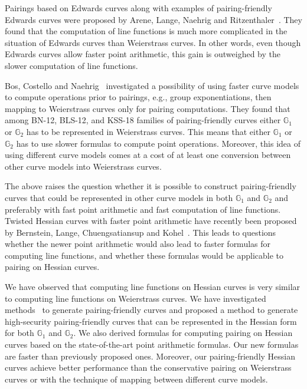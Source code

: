 Pairings based on Edwards curves
along with examples of pairing-friendly Edwards curves
were proposed by Arene, Lange, Naehrig and Ritzenthaler~\cite{2009/fastertate}.
They found that the computation of line functions is much more complicated in the situation of Edwards curves than Weierstrass curves.
In other words,
even though Edwards curves allow faster point arithmetic,
this gain is outweighed by the slower computation of line functions.

Bos, Costello and Naehrig~\cite{2013/bos-pairing} investigated a possibility of
using faster curve models to compute operations prior to pairings, e.g., group exponentiations,
then mapping to Weierstrass curves only for pairing computations.
They found that among BN-12, BLS-12, and KSS-18 families of pairing-friendly curves
either $\mathbb{G}_1$ or $\mathbb{G}_2$ has to be represented in Weierstrass curves.
This means that either $\mathbb{G}_1$ or $\mathbb{G}_2$ has to use slower formulas to compute point operations.
Moreover, this idea of using different curve models comes at a cost of at least one conversion
between other curve models into Weierstrass curves.

The above raises the question whether it is possible to construct pairing-friendly curves that could be
represented in other curve models in both $\mathbb{G}_1$ and $\mathbb{G}_2$
and preferably with fast point arithmetic and fast computation of line functions.
Twisted Hessian curves with faster point arithmetic have recently been proposed by
Bernstein, Lange, Chuengsatiansup and Kohel~\cite{2015/hessian}.
This leads to questions whether the newer point arithmetic would also lead to faster formulas for computing line functions,
and whether these formulas would be applicable to pairing on Hessian curves.

We have observed that computing line functions on Hessian curves is very similar to computing line functions on Weierstrass curves.
We have investigated methods~\cite{2010/freeman} to generate pairing-friendly curves
and proposed a method to generate high-security pairing-friendly curves
that can be represented in the Hessian form for both $\mathbb{G}_1$ and $\mathbb{G}_2$.
We also derived formulas for computing pairing on Hessian curves based on the state-of-the-art point arithmetic formulas.
Our new formulas are faster than previously proposed ones.
Moreover, our pairing-friendly Hessian curves achieve better performance than the conservative pairing on Weierstrass curves
or with the technique of mapping between different curve models.



%
%

%
